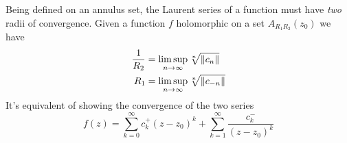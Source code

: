 \documentclass[../complete.tex]{subfiles}
\begin{document}
\begin{thm}
	Being defined on an annulus set, the Laurent series of a function must have \emph{two} radii of convergence. Given a function $f$ holomorphic on a set $A_{R_1R_2}(z_0)$ we have
	\begin{equation}
		\begin{aligned}
			\frac{1}{R_2}&=\limsup_{n\to\infty}\sqrt[n]{\norm{c_n}}\\
			R_1&=\limsup_{n\to\infty}\sqrt[n]{\norm{c_{-n}}}
		\end{aligned}
		\label{eq:laurentconvergence}
	\end{equation}
	It's equivalent of showing the convergence of the two series
	\begin{equation*}
		f(z)=\sum_{k=0}^{\infty}c_k^+(z-z_0)^k+\sum_{k=1}^{\infty}\frac{c_k^-}{(z-z_0)^k}
	\end{equation*}
\end{thm}
\end{document}
